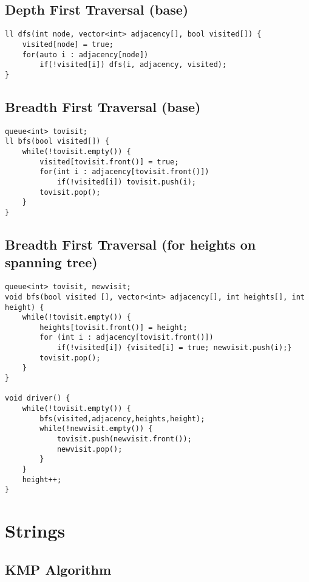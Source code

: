\documentclass{article}
\begin{document}
\begin{multicols*}{2}
        \subsection{Depth First Traversal (base)}


        \begin{lstlisting}
ll dfs(int node, vector<int> adjacency[], bool visited[]) {
    visited[node] = true;
    for(auto i : adjacency[node])
        if(!visited[i]) dfs(i, adjacency, visited);
}       \end{lstlisting}


        \subsection{Breadth First Traversal (base)}


        \begin{lstlisting}
queue<int> tovisit;
ll bfs(bool visited[]) {
    while(!tovisit.empty()) {
        visited[tovisit.front()] = true;
        for(int i : adjacency[tovisit.front()])
            if(!visited[i]) tovisit.push(i);
        tovisit.pop();
    }
}       \end{lstlisting}
        
        \subsection{Breadth First Traversal (for heights on spanning tree)}

        
        \begin{lstlisting}
queue<int> tovisit, newvisit;
void bfs(bool visited [], vector<int> adjacency[], int heights[], int height) {
    while(!tovisit.empty()) {
        heights[tovisit.front()] = height;
        for (int i : adjacency[tovisit.front()])
            if(!visited[i]) {visited[i] = true; newvisit.push(i);}
        tovisit.pop();
    }
}

void driver() {
    while(!tovisit.empty()) {
        bfs(visited,adjacency,heights,height);
        while(!newvisit.empty()) {
            tovisit.push(newvisit.front());
            newvisit.pop();
        }
    }
    height++;
}
        \end{lstlisting}
    \section{Strings}
        \subsection{KMP Algorithm}
        


\end{multicols*}
\end{document}
